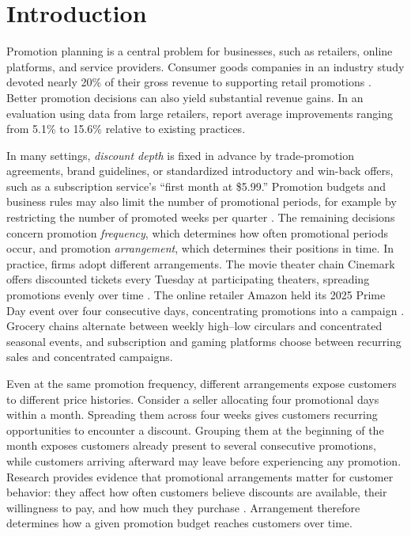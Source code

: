 \section{Introduction}\label{sec:introduction}

Promotion planning is a central problem for businesses, such as retailers, online platforms, and service providers. Consumer goods companies in an industry study devoted nearly 20\% of their gross revenue to supporting retail promotions \cite{singerholston2017}. Better promotion decisions can also yield substantial revenue gains. In an evaluation using data from large retailers, \citet{cohenhillel2023} report average improvements ranging from 5.1\% to 15.6\% relative to existing practices.

\begingroup\color{black}
In many settings, \emph{discount depth} is fixed in advance by trade-promotion agreements, brand guidelines, or standardized introductory and win-back offers, such as a subscription service's ``first month at \$5.99.'' Promotion budgets and business rules may also limit the number of promotional periods, for example by restricting the number of promoted weeks per quarter \citep{cohen2017promotion,cohen2021multiple}. The remaining decisions concern promotion \emph{frequency}, which determines how often promotional periods occur, and promotion \emph{arrangement}, which determines their positions in time. In practice, firms adopt different arrangements. The movie theater chain Cinemark offers discounted tickets every Tuesday at participating theaters, spreading promotions evenly over time \citep{cinemarkdiscounttuesdays}. The online retailer Amazon held its 2025 Prime Day event over four consecutive days, concentrating promotions into a campaign \citep{amazon2025primeday}. Grocery chains alternate between weekly high--low circulars and concentrated seasonal events, and subscription and gaming platforms choose between recurring sales and concentrated campaigns.

Even at the same promotion frequency, different arrangements expose customers to different price histories. Consider a seller allocating four promotional days within a month. Spreading them across four weeks gives customers recurring opportunities to encounter a discount. Grouping them at the beginning of the month exposes customers already present to several consecutive promotions, while customers arriving afterward may leave before experiencing any promotion. Research provides evidence that promotional arrangements matter for customer behavior: they affect how often customers believe discounts are available, their willingness to pay, and how much they purchase \citep{krishna1991patterns,krishna1994behavior}. Arrangement therefore determines how a given promotion budget reaches customers over time.

